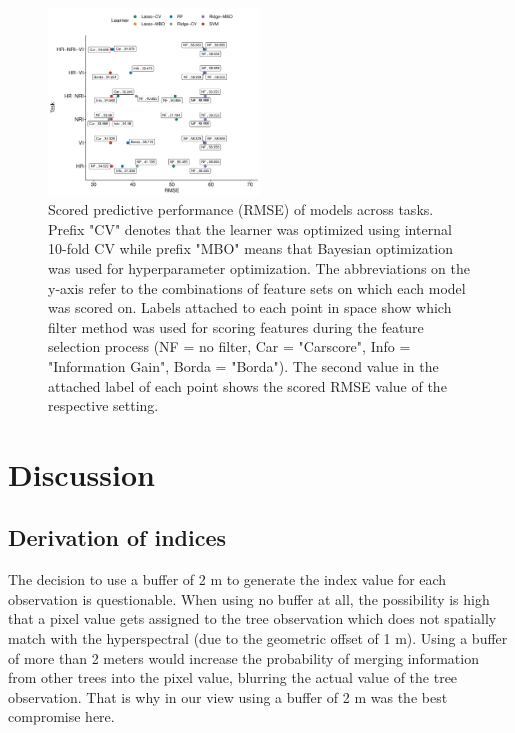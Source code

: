 \documentclass[letterpaper, journal]{IEEEtran}
\begin{document}
\begin{figure} [t!]
\centering
	\begin{center}
		\includegraphics[width=0.5\textwidth] {performance-results-1.pdf}
        \caption{Scored predictive performance (RMSE) of models across tasks. Prefix "CV" denotes that the learner was optimized using internal 10-fold CV while prefix "MBO" means that Bayesian optimization was used for hyperparameter optimization. The abbreviations on the y-axis refer to the combinations of feature sets on which each model was scored on. Labels attached to each point in space show which filter method was used for scoring features during the feature selection process (NF = no filter, Car = "Carscore", Info = "Information Gain", Borda = "Borda"). The second value in the attached label of each point shows the scored RMSE value of the respective setting.}
		\label{fig:perf-result}
	\end{center}
\end{figure}
\section{Discussion}

\subsection{Derivation of indices}

\noindent The decision to use a buffer of 2 m to generate the index value for each observation is questionable.
When using no buffer at all, the possibility is high that a pixel value gets assigned to the tree observation which does not spatially match with the hyperspectral (due to the geometric offset of 1 m).
Using a buffer of more than 2 meters would increase the probability of merging information from other trees into the pixel value, blurring the actual value of the tree observation.
That is why in our view using a buffer of 2 m was the best compromise here.
\end{document}
